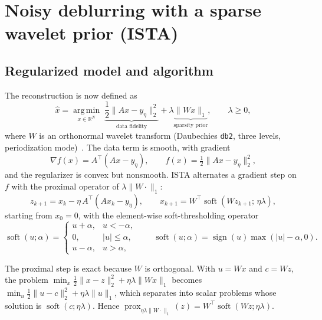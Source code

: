 \documentclass[11pt,a4paper]{article}
\newcommand{\R}{\mathbb{R}}
\newcommand{\argmin}{\operatorname*{arg\,min}}
\newcommand{\T}{\top}
\begin{document}
\section{Noisy deblurring with a sparse wavelet prior (ISTA)}\label{sec:ista}

\subsection{Regularized model and algorithm}

The reconstruction is now defined as
\begin{equation}
\hat{x}=\argmin_{x\in\R^N}\;
\underbrace{\frac12\|Ax-y_\eta\|_2^2}_{\text{data fidelity}}
+\lambda\underbrace{\|Wx\|_1}_{\text{sparsity prior}},
\qquad \lambda\ge0,
\label{eq:istaobj}
\end{equation}
where $W$ is an orthonormal wavelet transform (Daubechies \texttt{db2}, three levels,
periodization mode)~\cite{mallat2009}. The data term is smooth, with gradient
\begin{equation}
\nabla f(x)=A^\T(Ax-y_\eta),\qquad f(x)=\tfrac12\|Ax-y_\eta\|_2^2 ,
\label{eq:gradf}
\end{equation}
and the regularizer is convex but nonsmooth. ISTA alternates a gradient step on $f$ with the
proximal operator of $\lambda\|W\cdot\|_1$:
\begin{equation}
z_{k+1}=x_k-\eta\,A^\T(Ax_k-y_\eta),
\qquad
x_{k+1}=W^\T\operatorname{soft}\!\left(Wz_{k+1};\,\eta\lambda\right),
\label{eq:ista}
\end{equation}
starting from $x_0=0$, with the element-wise soft-thresholding operator
\begin{equation}
\operatorname{soft}(u;\alpha)=
\begin{cases}
u+\alpha, & u<-\alpha,\\
0, & |u|\le\alpha,\\
u-\alpha, & u>\alpha,
\end{cases}
\qquad
\operatorname{soft}(u;\alpha)=\operatorname{sign}(u)\max(|u|-\alpha,0).
\label{eq:soft}
\end{equation}

The proximal step is exact because $W$ is orthogonal. With $u=Wx$ and $c=Wz$, the problem
$\min_x\frac12\|x-z\|_2^2+\eta\lambda\|Wx\|_1$ becomes
$\min_u\frac12\|u-c\|_2^2+\eta\lambda\|u\|_1$, which separates into scalar problems whose solution
is $\operatorname{soft}(c;\eta\lambda)$. Hence
$\operatorname{prox}_{\eta\lambda\|W\cdot\|_1}(z)=W^\T\operatorname{soft}(Wz;\eta\lambda)$.
\end{document}
